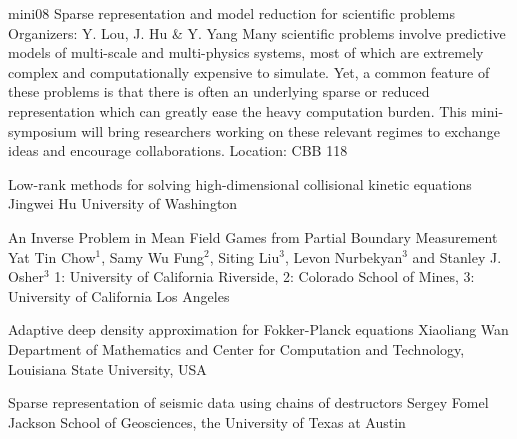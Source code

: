 \mini
{mini08}
{Sparse representation and model reduction for scientific problems}
{Organizers: Y. Lou, J. Hu \& Y. Yang}
{Many scientific problems involve predictive models of multi-scale and multi-physics systems, most of which are extremely complex and computationally expensive to simulate. Yet, a common feature of these problems is that there is often an underlying sparse or reduced representation which can greatly ease the heavy computation burden. This mini-symposium will bring researchers working on these relevant regimes to exchange ideas and encourage collaborations.}
{Location: CBB 118}

\begin{talks}
\item\talk
{Low-rank methods for solving high-dimensional collisional kinetic equations}
{Jingwei Hu}
{University of Washington}
\item\talk
{An Inverse Problem in Mean Field Games from Partial Boundary Measurement}
{Yat Tin Chow$^1$, Samy Wu Fung$^2$, Siting Liu$^3$, Levon Nurbekyan$^3$ and Stanley J. Osher$^3$}
{1: University of California Riverside, 2: Colorado School of Mines, 3: University of California Los Angeles}
\item\talk
{Adaptive deep density approximation for Fokker-Planck equations}
{Xiaoliang Wan}
{Department of Mathematics and Center for Computation and Technology, Louisiana State University, USA}
\item\talk
{Sparse representation of seismic data using chains of destructors}
{Sergey Fomel}
{Jackson School of Geosciences, the University of Texas at Austin}
\end{talks}
\room
